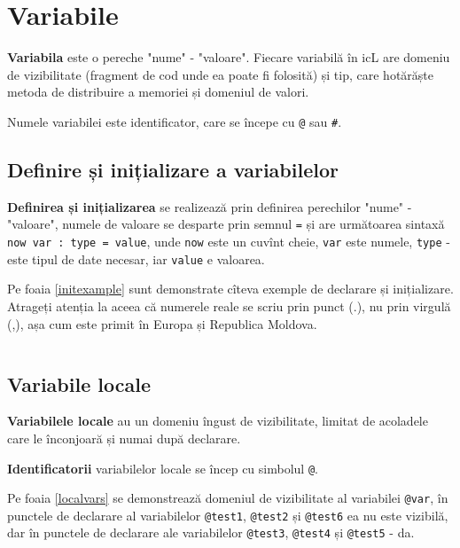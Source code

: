 \section{Variabile}

\textbf{Variabila} este o pereche "nume" - "valoare". Fiecare variabilă în icL are domeniu de vizibilitate (fragment de cod unde ea poate fi folosită) și tip, care hotărăște metoda de distribuire a memoriei și domeniul de valori.

Numele variabilei este identificator, care se începe cu \texttt{@} sau {\color{blue2}\texttt{#}}. 

\subsection{Definire și inițializare a variabilelor}

\textbf{Definirea și inițializarea} se realizează prin definirea perechilor "nume" - "valoare", numele de valoare se desparte prin semnul \texttt{=} și are următoarea sintaxă \texttt{now var : type = value}, unde \texttt{now} este un cuvînt cheie, \texttt{var} este numele, \texttt{type} - este tipul de date necesar, iar \texttt{value} e valoarea.

Pe foaia \ref{initexample} sunt demonstrate cîteva exemple de declarare și inițializare. Atrageți atenția la aceea că numerele reale se scriu prin punct (.), nu prin virgulă (,), așa cum este primit în Europa și Republica Moldova.

\begin{sourcecode}
    \label{initexample}
    \inputminted[linenos]{icl}{../sources/initexample.icL}
\end{sourcecode}

\subsection{Variabile locale}

\textbf{Variabilele locale} au un domeniu îngust de vizibilitate, limitat de acoladele care le înconjoară și numai după declarare.

{\bf Identificatorii} variabilelor locale se încep cu simbolul \texttt{@}.

Pe foaia \ref{localvars} se demonstrează domeniul de vizibilitate al variabilei \texttt{@var}, în punctele de declarare al variabilelor \texttt{@test1}, \texttt{@test2} și \texttt{@test6} ea nu este vizibilă, dar în punctele de declarare ale variabilelor \texttt{@test3}, \texttt{@test4} și \texttt{@test5} - da.

